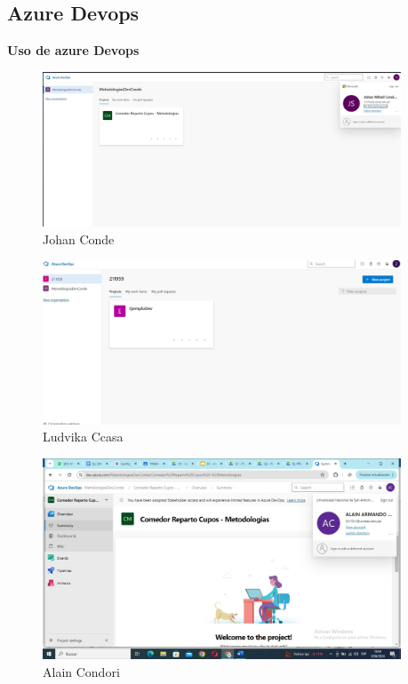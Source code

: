 \newpage
\subsection{Azure Devops}

\noindent\textbf{Uso de azure Devops}
\begin{figure}[h]
    \caption{Johan Conde}
    \begin{center}
        \includegraphics[width=0.95\textwidth]{images/devops_conde.jpeg}
    \end{center}
\end{figure}

\begin{figure}[h]
    \caption{Ludvika Ccasa}
    \begin{center}
        \includegraphics[width=0.95\textwidth]{images/devops_ccasa.jpeg}
    \end{center}
\end{figure}

\begin{figure}[h]
    \caption{Alain Condori}
    \begin{center}
        \includegraphics[width=0.95\textwidth]{images/devops_condori.jpeg}
    \end{center}
\end{figure}

